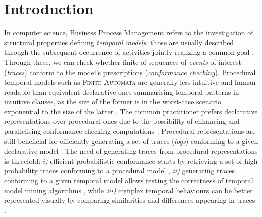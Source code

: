 \documentclass[sigconf]{acmart}
\begin{document}


\maketitle



\section{Introduction} 
In computer science, Business Process Management refers to the investigation of structural properties defining \textit{temporal models}; those are usually described through the subsequent occurrence of activities jointly realizing a common goal \cite{DBLP:books/sp/Weske19}.  Through these, we can check whether finite of sequences of \textit{events} of interest (\textit{traces}) conform to the model's prescriptions (\textit{conformance checking}). Procedural temporal models such as \textsc{Finite Automata} are generally less intuitive and human-readable than equivalent declarative ones summarising temporal patterns in intuitive clauses, as the size of the former is in the worst-case scenario exponential to the size of the latter \cite{ltlfnfa}. The common practitioner prefers declarative representations over procedural ones due to the possibility of enhancing and parallelising conformance-checking computations \cite{info14030173}. Procedural representations are still beneficial for efficiently generating a set of traces (\textit{logs}) conforming to a given declarative model  \cite{DBLP:conf/caise/CiccioBCM15}. The need of generating traces from procedural representations is threefold: \textit{i)} efficient probabilistic conformance starts by retrieving a set of high probability  traces conforming to a procedural model \cite{DBLP:conf/icpm/BergamiMMP21}, \textit{ii)} generating traces conforming to a given temporal model allows testing the correctness of temporal model mining algorithms \cite{DBLP:conf/caise/CiccioBCM15,DBLP:conf/ideas/ApplebyBM23}, while \textit{iii)} complex temporal  behaviours can be better represented visually by comparing similarities and differences appearing in traces \cite{8387499}.
\end{document}
